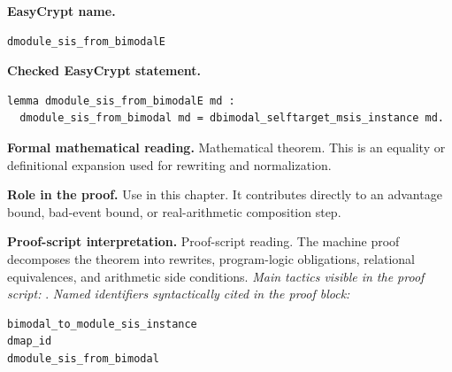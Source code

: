 \begin{formaltheorem}
\noindent\textbf{EasyCrypt name.}
\begin{lstlisting}[language=EasyCrypt,basicstyle=\ttfamily\scriptsize]
dmodule_sis_from_bimodalE
\end{lstlisting}
\noindent\textbf{Checked EasyCrypt statement.}
\begin{lstlisting}[language=EasyCrypt,basicstyle=\ttfamily\scriptsize]
lemma dmodule_sis_from_bimodalE md :
  dmodule_sis_from_bimodal md = dbimodal_selftarget_msis_instance md.
\end{lstlisting}
\noindent\textbf{Formal mathematical reading.}
Mathematical theorem. This is an equality or definitional expansion used for rewriting and normalization.

\noindent\textbf{Role in the proof.}
Use in this chapter. It contributes directly to an advantage bound, bad-event bound, or real-arithmetic composition step.

\noindent\textbf{Proof-script interpretation.}
Proof-script reading. The machine proof decomposes the theorem into rewrites, program-logic obligations, relational equivalences, and arithmetic side conditions.
\emph{Main tactics visible in the proof script:} .
\emph{Named identifiers syntactically cited in the proof block:}
\begin{lstlisting}[language=EasyCrypt,basicstyle=\ttfamily\scriptsize]
bimodal_to_module_sis_instance
dmap_id
dmodule_sis_from_bimodal
\end{lstlisting}

\end{formaltheorem}

